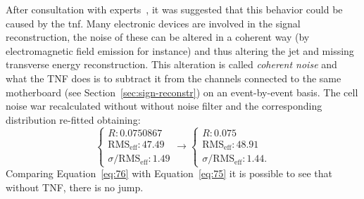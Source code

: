 After consultation with experts~\cite{PrivateConv}, it was suggested that this
behavior could be caused by the \gls{tnf}. Many electronic devices are involved
in the signal reconstruction, the noise of these can be altered in a coherent
way (by electromagnetic field emission for instance) and thus altering the jet
and missing transverse energy reconstruction. This alteration is called
\emph{coherent noise} and what the TNF does is to subtract it from the channels
connected to the same motherboard (see Section~\ref{sec:sign-reconstr}) on an
event-by-event basis. The cell noise war recalculated without without noise
filter and the corresponding distribution re-fitted obtaining:
\begin{equation}
  \label{eq:76}
  \begin{cases}
    R : 0.0750867 \\
    \text{RMS}_\text{eff} : 47.49 \\
    \sigma / \text{RMS}_\text{eff}: 1.49
  \end{cases}
  \to
  \begin{cases}
    R : 0.075  \\
    \text{RMS}_\text{eff}: 48.91 \\
    \sigma / \text{RMS}_\text{eff}: 1.44.
  \end{cases}
\end{equation}
Comparing Equation~\ref{eq:76} with Equation~\ref{eq:75} it is possible to see
that without TNF, there is no jump.

